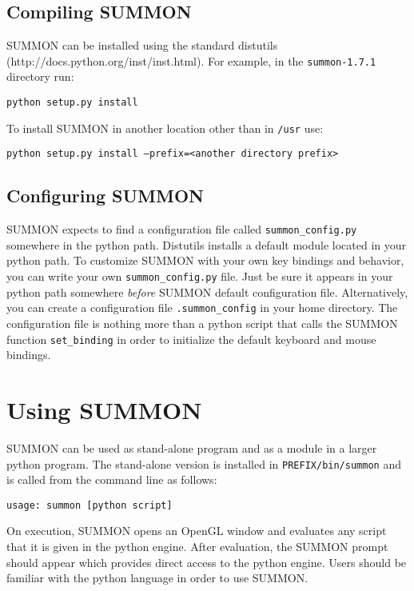 \documentclass[12pt]{article}
\newcommand{\code}[1]{{\tt #1}}
\newcommand{\codeblock}[1]{\vspace{.1in} {\tt #1} \vspace{.1in}}
\newcommand{\version}{1.7.1}
\begin{document}
\subsection{Compiling SUMMON}

SUMMON can be installed using the standard distutils 
(http://docs.python.org/inst/inst.html).  For example, in the
\code{summon-\version} directory run:

\codeblock{python setup.py install}

To install SUMMON in another location other than in \code{/usr} use:

\codeblock{python setup.py install --prefix=<another directory prefix>}


\subsection{Configuring SUMMON}

SUMMON expects to find a configuration file called  \code{summon\_config.py}
somewhere in the python path.  Distutils installs a default module located in
your python path.  To customize SUMMON with your own key bindings and behavior,
you can write your own \code{summon\_config.py} file.  Just be sure it appears
in your python path somewhere {\em before} SUMMON default configuration file. 
Alternatively, you can create a configuration file \code{.summon\_config} in
your home directory.  The configuration file is nothing more than a python
script that calls the SUMMON function  \code{set\_binding} in order to
initialize the default keyboard and mouse  bindings.



\section{Using SUMMON}
\label{sec:using}

SUMMON can be used as stand-alone program and as a module in a larger python
program.  The stand-alone version is installed in \code{PREFIX/bin/summon} and
is called from the command line as follows:

\codeblock{usage: summon [python script]}

On execution, SUMMON opens an OpenGL window and evaluates any script that it is
given in the python engine. After evaluation, the SUMMON prompt should appear
which provides direct access to the python engine.  Users should be familiar
with the python language in order to use SUMMON.
\end{document}
